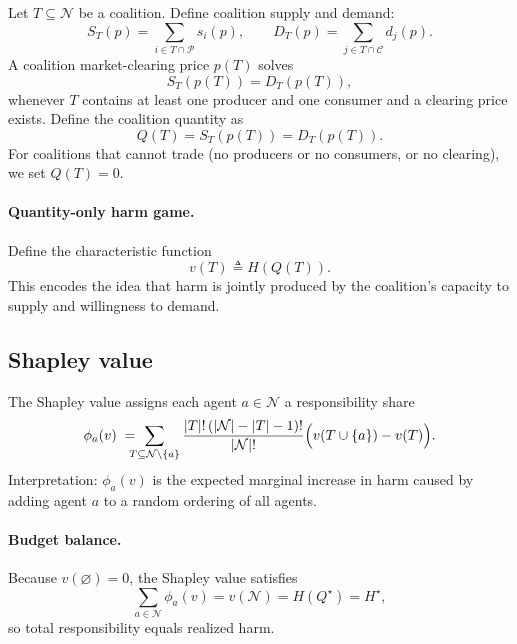 \documentclass[journal, a4paper]{IEEEtran}
\begin{document}
Let $T\subseteq \mathcal{N}$ be a coalition. Define coalition supply and demand:
\begin{equation}
S_T(p)=\sum_{i\in T\cap \mathcal{P}} s_i(p),\qquad
D_T(p)=\sum_{j\in T\cap \mathcal{C}} d_j(p).
\end{equation}
A coalition market-clearing price $p(T)$ solves
\begin{equation}
S_T(p(T))=D_T(p(T)),
\end{equation}
whenever $T$ contains at least one producer and one consumer and a clearing price exists. Define the coalition quantity as
\begin{equation}
Q(T)=S_T(p(T))=D_T(p(T)).
\end{equation}
For coalitions that cannot trade (no producers or no consumers, or no clearing), we set $Q(T)=0$.

\paragraph{Quantity-only harm game.}
Define the characteristic function
\begin{equation}
v(T)\triangleq H(Q(T)).
\label{eq:charfunc}
\end{equation}
This encodes the idea that harm is jointly produced by the coalition's capacity to supply and willingness to demand.

\subsection{Shapley value}
The Shapley value assigns each agent $a\in \mathcal{N}$ a responsibility share
\begin{equation}
\phi_a(v)\;=\mspace{-13mu}\sum_{T\subseteq \mathcal{N}\setminus\{a\}}
\frac{|T|!\,(|\mathcal{N}|-|T|-1)!}{|\mathcal{N}|!}\Big(v(T\cup\{a\})-v(T)\Big).
\label{eq:shapley}
\end{equation}
Interpretation: $\phi_a(v)$ is the expected marginal increase in harm caused by adding agent $a$ to a random ordering of all agents.

\paragraph{Budget balance.}
Because $v(\varnothing)=0$, the Shapley value satisfies
\begin{equation}
\sum_{a\in \mathcal{N}} \phi_a(v)=v(\mathcal{N})=H(Q^\star)=H^\star,
\end{equation}
so total responsibility equals realized harm.
\end{document}
